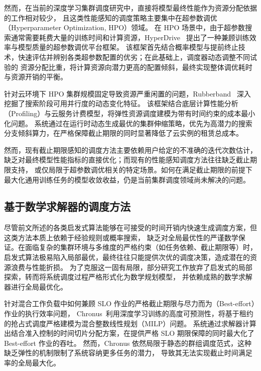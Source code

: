 然而，在当前的深度学习集群调度研究中，直接将模型最终性能作为资源分配依据的工作相对较少，
且这类性能感知的调度策略主要集中在超参数调优（Hyperparameter Optimization, HPO）领域。
在 HPO 场景中，由于超参数搜索通常需要耗费大量的训练时间和计算资源，HyperDrive~\cite{rasley2017hyperdrive}
提出了一种兼顾训练效率与模型质量的超参数调优平台框架。
该框架首先结合概率模型与提前终止技术，快速评估并辨别各类超参数配置的优劣；在此基础上，调度器动态调整不同试验的
资源分配比重，将计算资源向潜力更高的配置倾斜，最终实现整体调优耗时与资源开销的平衡。

针对云环境下 HPO 集群规模固定导致资源严重闲置的问题，Rubberband~\cite{misra2021rubberband} 深入挖掘了搜索阶段可用并行度的动态变化特征。
该框架结合底层计算性能分析（Profiling）与云服务计费模型，将弹性资源调度建模为带有时间约束的成本最小化问题。
系统通过在运行时动态生成最优的集群伸缩策略，优先为高潜力的搜索分支倾斜算力，在严格保障截止期限的同时显著降低了云实例的租赁总成本。

然而，现有截止期限感知的调度方法主要依赖用户给定的不准确的迭代次数估计，
缺乏对最终模型性能指标的直接优化；而现有的性能感知调度方法往往缺乏截止期限支持，
或仅局限于超参数调优相关的特定场景。如何在满足截止期限的前提下最大化通用训练任务的模型收敛收益，仍是当前集群调度领域尚未解决的问题。

\subsection{基于数学求解器的调度方法}\label{subsec:solver}
尽管前文所述的各类启发式算法能够在可接受的时间开销内快速生成调度方案，但这类方法本质上依赖于经验规则或概率搜索，
缺乏对全局最优性的严谨数学保证。在面临复杂的集群环境与多维度的严格约束（如任务依赖、截止期限等）时，
启发式算法极易陷入局部最优，最终往往只能提供次优的调度决策，造成潜在的资源浪费与性能折损。
为了克服这一固有局限，部分研究工作放弃了启发式的局部探索，转而将系统调度过程严格形式化为数学规划模型，
并依赖成熟的数学求解器进行全局最优化。

针对混合工作负载中如何兼顾 SLO 作业的严格截止期限与尽力而为（Best-effort）作业的执行效率问题，
Chronus~\cite{gao2021chronus}利用深度学习训练的高度可预测性，将基于租约的抢占式调度严格建模为混合整数线性规划（MILP）问题。
系统通过求解器计算出结合准入控制的时间切片分配方案，在提供严格 SLO 期限保障的同时最大化了 Best-effort 作业的吞吐。
然而，Chronus 依然局限于静态的群组调度范式，这种缺乏弹性的机制限制了系统容纳更多任务的潜力，
导致其无法实现截止时间满足率的全局最大化。


